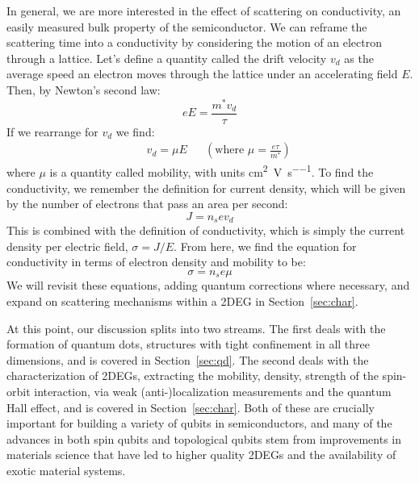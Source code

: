 In general, we are more interested in the effect of scattering on conductivity, an easily measured bulk property of
the semiconductor. We can reframe the scattering time into a conductivity by considering the motion of an electron
through a lattice. Let's define a quantity called the drift velocity $v_d$ as the average speed an electron moves through
the lattice under an accelerating field $E$. Then, by Newton's second law:
\begin{equation}
  eE = \frac{m^* v_d}{\tau}
\end{equation}
If we rearrange for $v_d$ we find:
\begin{align}
  && v_d = \mu E && (\textrm{where~} \mu = \frac{e \tau}{m^*})
  \label{eq:driftv}
\end{align}
where $\mu$ is a quantity called mobility, with units \si{\square\centi\meter\per\volt\per\second}.
To find the conductivity, we remember the definition for current
density, which will be given by the number of electrons that pass an area per second:
\begin{equation}
  J = n_s e v_d
  \label{eq:currden}
\end{equation}
This is combined with the definition of conductivity, which is simply the current density per electric field, $\sigma = J/E$. From here,
we find the equation for conductivity in terms of electron density and mobility to be:
\begin{equation}
  \sigma = n_s e \mu
  \label{eq:cond}
\end{equation}
We will revisit these equations, adding quantum corrections where necessary, and expand on scattering mechanisms within a
2DEG in Section~\ref{sec:char}.

At this point, our discussion splits into two streams.
The first deals with the formation of quantum dots, structures with tight confinement in all three dimensions,
and is covered in Section~\ref{sec:qd}. The second deals with the characterization of 2DEGs, extracting
the mobility, density, strength of the spin-orbit interaction, via weak (anti-)localization measurements and the quantum
Hall effect, and is covered in Section~\ref{sec:char}. Both of these are crucially important for building a variety of
qubits in semiconductors, and many of the advances in both spin qubits and topological qubits stem
from improvements in materials science that have led to higher quality 2DEGs and the availability of exotic material systems.

